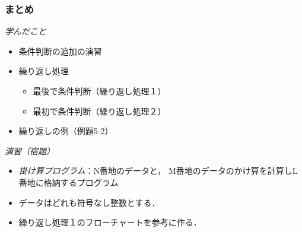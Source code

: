 \documentclass[handout]{beamer}        %
\begin{document}
\begin{frame}
  \frametitle{まとめ}
  \emph{学んだこと}
  \begin{itemize}
  \item 条件判断の追加の演習
  \item 繰り返し処理
    \begin{itemize}
    \item 最後で条件判断（繰り返し処理１）
    \item 最初で条件判断（繰り返し処理２）
    \end{itemize}
  \item 繰り返しの例（例題5-2）
  \end{itemize}
  \vfill

  \emph{演習（宿題）}
  \begin{itemize}
  \item \emph{掛け算プログラム}：N番地のデータと，
    M番地のデータのかけ算を計算しL番地に格納するプログラム
  \item データはどれも符号なし整数とする．
  \item 繰り返し処理１のフローチャートを参考に作る．
  \end{itemize}
  \vfill
\end{frame}
\end{document}
